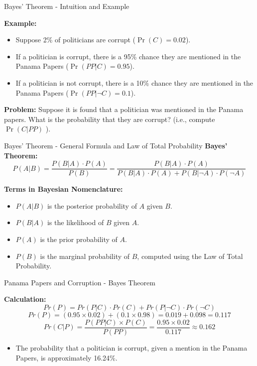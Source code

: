 \documentclass[handout]{beamer} %
\begin{document}
\begin{frame}{Bayes' Theorem - Intuition and Example}

    \textbf{Example:}\pause
    \begin{itemize}
        \item Suppose 2\% of politicians are corrupt (\(\Pr(C) = 0.02\)).\pause
        \item If a politician is corrupt, there is a 95\% chance they are mentioned in the Panama Papers (\(\Pr(PP|C) = 0.95\)).\pause
        \item If a politician is not corrupt, there is a 10\% chance they are mentioned in the Panama Papers (\(\Pr(PP|\neg C) = 0.1\)).\pause
    \end{itemize}

    \textbf{Problem:} Suppose it is found that a politician was mentioned in the Panama papers. What is the probability that they are corrupt? (i.e., compute \(\Pr(C|PP)\) ).
\end{frame}


\begin{frame}{Bayes' Theorem - General Formula and Law of Total Probability}
    \textbf{Bayes' Theorem:}
    \[
    P(A|B) = \dfrac{P(B|A) \cdot P(A)}{P(B)} = \frac{P(B|A) \cdot P(A)}{P(B|A) \cdot P(A) + P(B|\neg A) \cdot P(\neg A)}
    \]\pause

    \textbf{Terms in Bayesian Nomenclature:}\pause
    \begin{itemize}
        \item \(P(A|B)\) is the posterior probability of \(A\) given \(B\).\pause
        \item \(P(B|A)\) is the likelihood of \(B\) given \(A\).\pause
        \item \(P(A)\) is the prior probability of \(A\).\pause
        \item \(P(B)\) is the marginal probability of \(B\), computed using the Law of Total Probability.\pause
    \end{itemize}
\end{frame}




\begin{frame}{Panama Papers and Corruption - Bayes Theorem}

    \textbf{Calculation:}
    \[
    Pr(P) = Pr(P|C) \cdot Pr(C) + Pr(P|\neg C) \cdot Pr(\neg C)
    \]\pause
    \[
    Pr(P) = (0.95 \times 0.02) + (0.1 \times 0.98) = 0.019 + 0.098 = 0.117
    \]\pause
    \[
    Pr(C|P) = \frac{P(PP|C) \times P(C)}{P(PP)} = \frac{0.95 \times 0.02}{0.117} \approx 0.162
    \]\pause
    \begin{itemize}
        \item The probability that a politician is corrupt, given a mention in the Panama Papers, is approximately 16.24\%.
    \end{itemize}
\end{frame}
\end{document}
